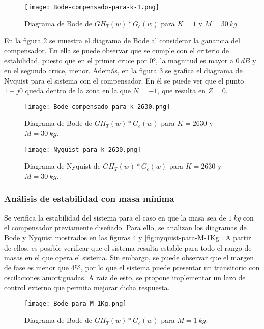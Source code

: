 \begin{figure}[H]
	\centering
	\texttt{[image: Bode-compensado-para-k-1.png]}
	\caption{Diagrama de Bode de $GH_T(w)*G_c(w)$ para $K=1$ y $M=30\:kg$.}
	\label{fig:bode-compensado-para-k-1}
\end{figure}
 
En la figura \ref{fig:bode-compensado-para-k-2630} se muestra el diagrama de Bode al considerar la ganancia del compensador. En ella se puede observar que se  cumple con el criterio de estabilidad, puesto que en el primer cruce por 0°, la magnitud es mayor a $0\:dB$ y en el segundo cruce, menor. Además, en la figura \ref{fig:nyquist-para-k-2630} se grafica el diagrama de Nyquist para el sistema con el compensador. En él se puede ver que el punto $1+j0$ queda dentro de la zona en la que $N=-1$, que resulta en $Z=0$.

\begin{figure}[H]
	\centering
	\texttt{[image: Bode-compensado-para-k-2630.png]}
	\caption{Diagrama de Bode de $GH_T(w)*G_c(w)$ para $K=2630$ y $M=30\:kg$.}
	\label{fig:bode-compensado-para-k-2630}
\end{figure}

\begin{figure}[H]
	\centering
	\texttt{[image: Nyquist-para-k-2630.png]}
	\caption{Diagrama de Nyquist de $GH_T(w)*G_c(w)$ para $K=2630$ y $M=30\:kg$.}
	\label{fig:nyquist-para-k-2630}
\end{figure}

\subsubsection{Análisis de estabilidad con masa mínima}


Se verifica la estabilidad del sistema  para el caso en que la masa sea de $1\:kg$ con el compensador previamente diseñado. Para ello, se analizan los diagramas de Bode y Nyquist mostrados en las figuras \ref{fig:bode-para-M-1Kg} y \ref{fig:nyquist-para-M-1Kg}. A partir de ellos, es posible verificar que el sistema resulta estable para todo el rango de masas en el que opera el sistema. Sin embargo, se puede observar que el margen de fase es menor que 45°, por lo que el sistema puede presentar un transitorio con oscilaciones amortiguadas. A raíz de esto, se propone implementar un lazo de control externo que permita mejorar dicha respuesta.


\begin{figure}[H]
	\centering
	\texttt{[image: Bode-para-M-1Kg.png]}
	\caption{Diagrama de Bode de $GH_T(w)*G_c(w)$ para $M=1\:kg$.}
	\label{fig:bode-para-M-1Kg}
\end{figure}

